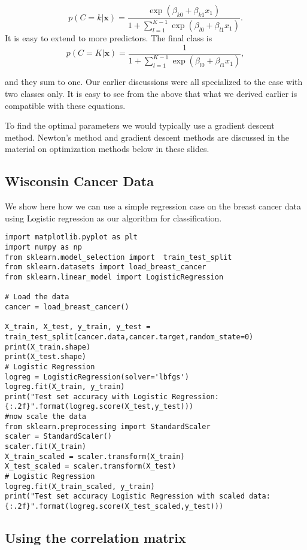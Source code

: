 \documentclass[%
oneside,                 %
final,                   %
10pt]{article}
\begin{document}
\[
p(C=k\vert \mathbf {x} )=\frac{\exp{(\beta_{k0}+\beta_{k1}x_1)}}{1+\sum_{l=1}^{K-1}\exp{(\beta_{l0}+\beta_{l1}x_1)}}.
\]
It is easy to extend to more predictors. The final class is 
\[
p(C=K\vert \mathbf {x} )=\frac{1}{1+\sum_{l=1}^{K-1}\exp{(\beta_{l0}+\beta_{l1}x_1)}},
\]

and they sum to one. Our earlier discussions were all specialized to
the case with two classes only. It is easy to see from the above that
what we derived earlier is compatible with these equations.

To find the optimal parameters we would typically use a gradient
descent method.  Newton's method and gradient descent methods are
discussed in the material on optimization
methods below in these slides.




\subsection*{Wisconsin Cancer Data}

We show here how we can use a simple regression case on the breast
cancer data using Logistic regression as our algorithm for
classification.


\begin{verbatim}
import matplotlib.pyplot as plt
import numpy as np
from sklearn.model_selection import  train_test_split 
from sklearn.datasets import load_breast_cancer
from sklearn.linear_model import LogisticRegression

# Load the data
cancer = load_breast_cancer()

X_train, X_test, y_train, y_test = train_test_split(cancer.data,cancer.target,random_state=0)
print(X_train.shape)
print(X_test.shape)
# Logistic Regression
logreg = LogisticRegression(solver='lbfgs')
logreg.fit(X_train, y_train)
print("Test set accuracy with Logistic Regression: {:.2f}".format(logreg.score(X_test,y_test)))
#now scale the data
from sklearn.preprocessing import StandardScaler
scaler = StandardScaler()
scaler.fit(X_train)
X_train_scaled = scaler.transform(X_train)
X_test_scaled = scaler.transform(X_test)
# Logistic Regression
logreg.fit(X_train_scaled, y_train)
print("Test set accuracy Logistic Regression with scaled data: {:.2f}".format(logreg.score(X_test_scaled,y_test)))
\end{verbatim}

\subsection*{Using the correlation matrix}
\end{document}
